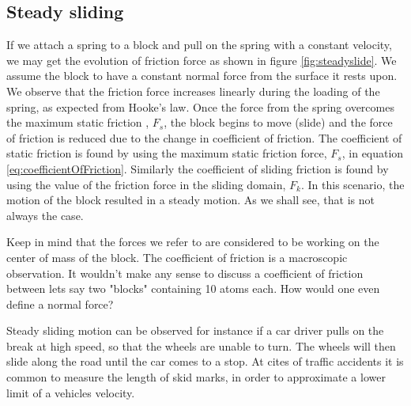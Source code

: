 \documentclass[twoside,english]{uiofysmaster}
\begin{document}
\subsection{Steady sliding}
If we attach a spring to a block and pull on the spring with a constant velocity, we may get the evolution of friction force as shown in figure \ref{fig:steadyslide}.
We assume the block to have a constant normal force from the surface it rests upon. 
We observe that the friction force increases linearly during the loading of the spring, as expected from Hooke's law. 
Once the force from the spring overcomes the maximum static friction , $F_s$, the block begins to move (slide) and the force of friction is reduced due to the change in coefficient of friction. 
The coefficient of static friction is found by using the maximum static friction force, $F_s$, in equation \eqref{eq:coefficientOfFriction}. 
Similarly the coefficient of sliding friction is found by using the value of the friction force in the sliding domain, $F_k$.
In this scenario, the motion of the block resulted in a steady motion. 
As we shall see, that is not always the case.

Keep in mind that the forces we refer to are considered to be working on the center of mass of the block. 
The coefficient of friction is a macroscopic observation.
It wouldn't make any sense to discuss a coefficient of friction between lets say two "blocks" containing 10 atoms each.
How would one even define a normal force? 

Steady sliding motion can be observed for instance if a car driver pulls on the break at high speed, so that the wheels are unable to turn.
The wheels will then slide along the road until the car comes to a stop. 
At cites of traffic accidents it is common to measure the length of skid marks, in order to approximate a lower limit of a vehicles velocity. 
\end{document}
